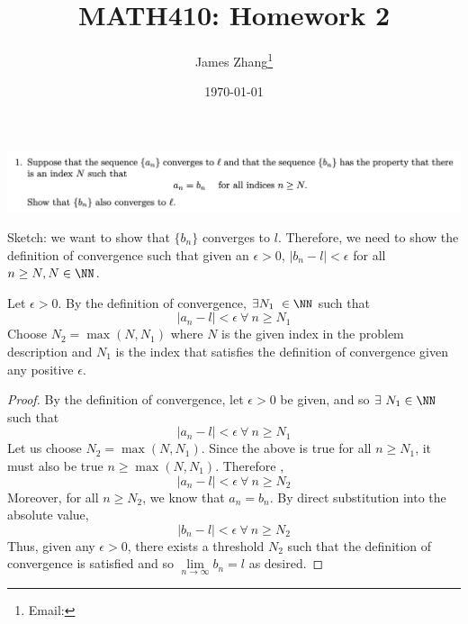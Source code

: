\documentclass[12pt]{scrartcl}
\begin{document}
\title{MATH410: Homework 2}
\author{James Zhang\thanks{Email: }}
\date{\today}



\maketitle

\includegraphics[width=15cm]{1.png}

Sketch: we want to show that $\{b_n\}$ converges to $l$. Therefore, we need to show the 
definition of convergence such that given an $\epsilon > 0$,  $|b_n - l| < \epsilon$ for all $n \geq N, N \in \NN$.

Let $\epsilon > 0$. By the definition of convergence, $\exists N_1 \ \in \NN$ such that 
\[|a_n - l| < \epsilon \ \forall \ n \geq N_1\]
Choose $N_2 = \max(N, N_1)$ where $N$ is the given index in the problem description and 
$N_1$ is the index that satisfies the definition of convergence given any positive $\epsilon$.

\begin{proof}
  By the definition of convergence, let $\epsilon > 0$ be given, and so $\exists \ N_1 \in \NN$ such that 
  \[|a_n - l| < \epsilon \ \forall \ n \geq N_1\]
  Let us choose $N_2 = \max(N, N_1)$. Since the above is true for all $n \geq N_1$, it must also 
  be true $n \geq \max(N, N_1)$. Therefore ,
  \[|a_n - l| < \epsilon \ \forall \ n \geq N_2\]
  Moreover, for all $n \geq N_2$, we know that $a_n = b_n$. By direct substitution into the absolute value, 
  \[|b_n - l| < \epsilon \ \forall \ n \geq N_2\]
  Thus, given any $\epsilon > 0$, there exists a threshold $N_2$ such that the definition of
  convergence is satisfied and so $\underset{n\to\infty}{\lim}b_n = l$ as desired.
\end{proof}
\end{document}

